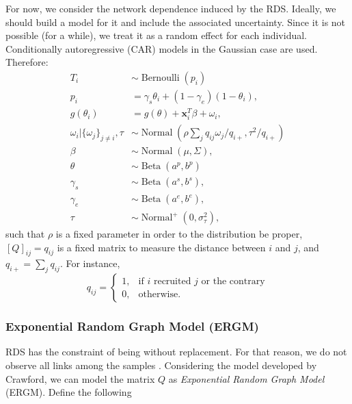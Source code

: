 \documentclass[a4paper, notitlepage, 11pt]{article}
\newcommand{\x}{\boldsymbol{x}}
\newcommand{\N}{\operatorname{Normal}}
\newcommand{\betadist}{\operatorname{Beta}}
\newcommand{\bern}{\operatorname{Bernoulli}}
\theoremstyle{definition}
\theoremstyle{remark}
\begin{document}
For now, we consider the network dependence induced by the RDS. Ideally, we 
should build a model for it and include the associated uncertainty.
Since it is not possible (for a while), we treat it as a random effect for
each individual. Conditionally autoregressive (CAR) models in the
Gaussian case are used. Therefore: 
\begin{equation}
  \begin{aligned}
    T_i &\sim \bern(p_i) \\
    p_i &= \gamma_s\theta_i + (1-\gamma_e)(1 - \theta_i),  \\
    g(\theta_i) &= g(\theta) + \x_i^T\beta + \omega_i,  \\
    \omega_i|\{\omega_j\}_{j\neq i}, \tau &\sim \N\left(\rho\sum_j q_{ij}\omega_j/q_{i+}, \tau^2/q_{i+}\right) \\
    \beta &\sim \N(\mu, \Sigma), \\ 
    \theta &\sim \betadist(a^p, b^p) \\
    \gamma_s &\sim \betadist(a^s, b^s), \\
    \gamma_e &\sim \betadist(a^e, b^e), \\  
    \tau &\sim \N^+(0,\sigma^2_{\tau}),  
  \end{aligned}  
\end{equation}
such that $\rho$ is a fixed parameter in order to the distribution be proper, $[Q]_{ij} = q_{ij}$ is a fixed matrix to measure the distance between $i$
and $j$, and $q_{i+} = \sum_{j} q_{ij}$. For instance,
$$
q_{ij} = \begin{cases}
  1, &\text{if } i \text{ recruited } j \text{ or the contrary} \\
  0, &\text{otherwise.} 
\end{cases}
$$

\subsubsection{Exponential Random Graph Model (ERGM)}

RDS has the constraint of being without replacement. For that reason, we do
not observe all links among the samples \cite[]{crawford2016}. Considering the
model developed by Crawford, we can model the
matrix $Q$ as {\em Exponential Random Graph Model} (ERGM). Define the
following 
\end{document}
